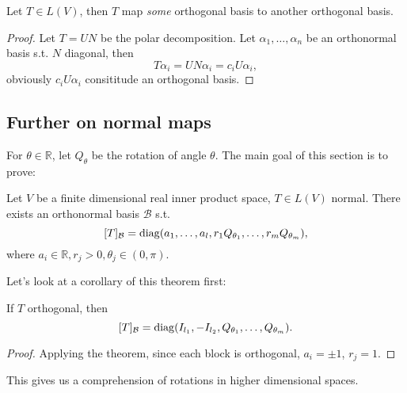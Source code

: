 \begin{corollary}
    Let $T\in L(V)$, then $T$ map \textit{some} orthogonal basis to
	another orthogonal basis.
\end{corollary}
\begin{proof}[Proof]
    Let $T = U N$ be the polar decomposition.
	Let $\alpha_1, \dots, \alpha_n$ be an orthonormal basis s.t. $N$ diagonal,
	then
	\[
	T\alpha_i = UN\alpha_i = c_i U \alpha_i,
	\]
	obviously $c_iU\alpha_i$ consititude an orthogonal basis.
\end{proof}

\subsection{Further on normal maps}
\label{sub:Further on normal maps}
For $\theta\in \mathbb{R}$, let $Q_\theta$ be the rotation of angle $\theta$.
The main goal of this section is to prove:
\begin{theorem}
	\label{thm:normaldecom}
    Let $V$ be a finite dimensional real inner product space, $T\in L(V)$ normal.
	There exists an orthonormal basis $ \mathcal{B}$ s.t.
	\[
		[T]_{\mathcal{B}} = \operatorname{diag}(a_1, \dots, a_l,
		r_1Q_{\theta_1}, \dots, r_mQ_{\theta_m}),
	\]
	where $a_i \in \mathbb{R}, r_j > 0, \theta_j \in (0, \pi)$.
\end{theorem}

Let's look at a corollary of this theorem first:
\begin{corollary}
    If $T$ orthogonal, then
	\[
		[T]_{\mathcal{B}} = \operatorname{diag}(I_{l_1}, -I_{l_2},
		Q_{\theta_1}, \dots, Q_{\theta_m}).
	\]
\end{corollary}
\begin{proof}[Proof]
    Applying the theorem, since each block is orthogonal, $a_i = \pm 1$, $r_j = 1$.
\end{proof}
This gives us a comprehension of rotations in higher dimensional spaces.

